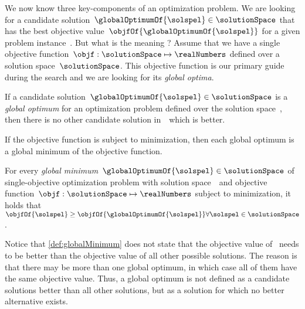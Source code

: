 %
%
We now know three key-components of an optimization problem.
We are looking for a candidate solution~$\globalOptimumOf{\solspel}\in\solutionSpace$ that has the best objective value~$\objfOf{\globalOptimumOf{\solspel}}$ for a given problem instance~\instance.
But what is the meaning ?%
%
%
%
Assume that we have a single objective function~$\objf:\solutionSpace\mapsto\realNumbers$ defined over a solution space~$\solutionSpace$.
This objective function is our primary guide during the search and we are looking for its \emph{global optima}.%
%
\begin{definition}%
\label{def:globalOptimum}%
If a candidate solution~$\globalOptimumOf{\solspel}\in\solutionSpace$ is a \emph{global optimum} for an optimization problem defined over the solution space~\solutionSpace, then there is no other candidate solution in~\solutionSpace\ which is better.%
\end{definition}%
%
If the objective function is subject to minimization, then each global optimum is a global minimum of the objective function.%
%
\begin{definition}%
\label{def:globalMinimum}%
For every \emph{global minimum}~$\globalOptimumOf{\solspel}\in\solutionSpace$ of single-objective optimization problem with solution space~\solutionSpace\ and objective function~$\objf:\solutionSpace\mapsto\realNumbers$ subject to minimization, it holds that $\objfOf{\solspel} \geq \objfOf{\globalOptimumOf{\solspel}} \forall \solspel \in \solutionSpace$.%
\end{definition}%
%
Notice that \autoref{def:globalMinimum} does not state that the objective value of~\globalOptimumOf{\solspel} needs to be better than the objective value of all other possible solutions.
The reason is that there may be more than one global optimum, in which case all of them have the same objective value.
Thus, a global optimum is not defined as a candidate solutions better than all other solutions, but as a solution for which no better alternative exists.

